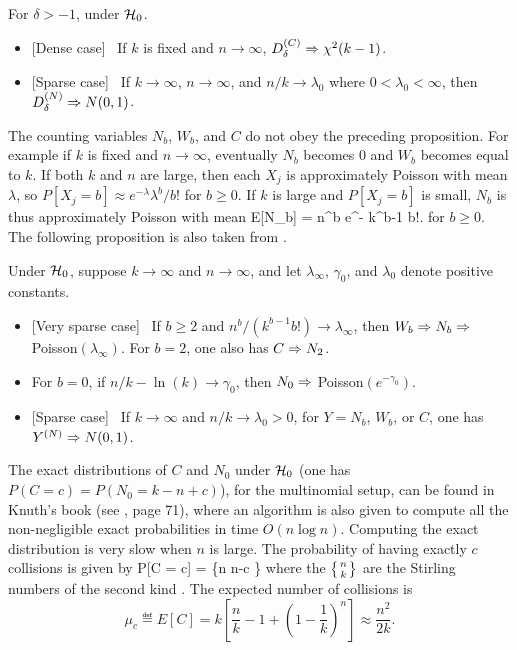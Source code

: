 \begin {proposition}
\label {prop1}
For $\delta > -1$, under $\mathcal{H}_0$.
\begin {itemize}
\item[{\rm (i)}]
{\rm [Dense case]} \
If $k$ is fixed and $n\to\infty$, $D_{\delta}^{(C)} \Rightarrow \chi^2(k-1)$.
%
\item[{\rm (ii)}]
{\rm [Sparse case]} \
If $k\to\infty$, $n\to\infty$, and $n/k \to\lambda_0$ where
$0<\lambda_0<\infty$, then $D_{\delta}^{(N)} \Rightarrow N(0,1)$.
\end {itemize}
\end {proposition}

The counting variables $N_b$, $W_b$, and $C$ do not obey the
preceding proposition.
For example if $k$ is fixed and $n\to\infty$, eventually $N_b$ becomes
0 and $W_b$ becomes equal to $k$.
If both $k$ and $n$ are large, then each $X_j$ is approximately
Poisson with mean $\lambda$,
so $P[X_j = b] \approx e^{-\lambda} \lambda^b/b!$ for $b\ge 0$.
If $k$ is large and $P[X_j=b]$ is small, $N_b$ is thus approximately
Poisson with mean
\eq
  E[N_b] = {n^b e^{-\lambda} \over k^{b-1} b!}.
                                                         \label{eq:ENb}
\endeq
for $b\ge 0$.  The following proposition is also taken from \cite{rLEC02c}.

\begin {proposition}
\label {prop2}
Under $\mathcal{H}_0$, suppose $k\to\infty$ and $n\to\infty$,
and let $\lambda_\infty$,
$\gamma_0$, and $\lambda_0$ denote positive constants.
\begin {itemize}
\item[{\rm (i)}]
{\rm [Very sparse case]} \
If $b \ge 2$ and $n^b / (k^{b-1} b!) \to \lambda_\infty$, then
$W_b \Rightarrow N_b \Rightarrow$ {\rm Poisson}$(\lambda_\infty)$.
For $b=2$, one also has $C \Rightarrow N_2$.
%
\item[{\rm (ii)}]
For $b=0$, if $n/k - \ln(k) \to \gamma_0$, then
$N_0 \Rightarrow$ {\rm Poisson}$(e^{-\gamma_0})$.
%
\item[{\rm (iii)}]
{\rm [Sparse case]} \
If $k\to\infty$ and $n/k \to\lambda_0 > 0$,
for $Y = N_b$, $W_b$, or $C$, one has $Y^{(N)} \Rightarrow N(0,1)$.
\end {itemize}
\end {proposition}

 The exact distributions of $C$ and $N_0$ under $\mathcal{H}_0$
 (one has $P(C = c) = P(N_0 = k-n+c)$), for the multinomial setup,
 can be found in Knuth's book
 (see \cite {rKNU98a}, page 71), where an algorithm is also given to
  compute all the non-negligible exact probabilities in time $O(n\log n)$.
  Computing the exact distribution is very slow
  when $n$ is large.
  The probability of having exactly $c$ collisions is given by
  \eq
   P[C = c] = 
             \left\{{n \atop n-c }\right\}           
  \endeq
  where the $\left\{{n \atop k}\right\}$ are the Stirling numbers of
  the second kind \cite{iKNU97a}.
  The expected number of collisions is
  $$
    \mu_c \eqdef E[C]
   = k \left[{\textstyle \frac n k - 1 + \left(1 - \frac1k\right)^n}\right]
   \approx \frac{n^2}{2k}.
  $$

